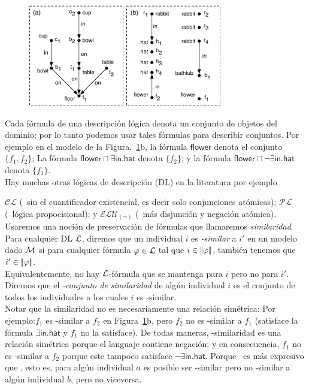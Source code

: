 \begin{figure}[t]
\begin{center}
\includegraphics[width=8.5cm]{figures/pic-dale-haddock.pdf}\\[0pt]
\caption{}
\label{fig:dale-haddock}
\end{center}
\end{figure}


Cada f\'ormula de una descripci\'on l\'ogica denota un conjunto de objetos del dominio; por lo tanto podemos usar tales f\'ormulas para describir conjuntos. Por ejemplo en el modelo de la Figura.~\ref{fig:dale-haddock}b, la f\'ormula
$\mathsf{flower}$ denota el conjunto $\{f_1,f_2\}$; La f\'ormula
$\mathsf{flower} \sqcap \exists \mathsf{in}.\mathsf{hat}$ denota
$\{f_2\}$; y la f\'ormula $\mathsf{flower} \sqcap \neg
\exists \mathsf{in}.\mathsf{hat}$ denota $\{f_1\}$.\\

Hay muchas otras l\'ogicas de descripci\'on (DL) en la literatura por ejemplo 

$\mathcal{CL}$ (\el\ sin el cuantificador existencial, es decir solo conjunciones at\'omicas); $\mathcal{PL}$ (\alc\ l\'ogica propocisional); y
$\mathcal{ELU}_{(\neg)}$ (\el\ m\'as disjunci\'on y negaci\'on at\'omica).\\

Usaremos una noci\'on de preservaci\'on de f\'ormulas que llamaremos
\emph{similaridad}. Para cualquier DL $\mathcal{L}$, diremos que un individual $i$ es \emph{\gL-similar} a $i'$ en un modelo dado $\mathcal{M}$
si para cualquier f\'ormula $\varphi \in \mathcal{L}$ tal que $i \in
|\!|\varphi|\!|$, tambi\'en tenemos que $i' \in |\!|\varphi|\!|$.\\
Equivalentemente, no hay $\mathcal{L}$-f\'ormula que se mantenga para $i$ pero no para
$i'$.  Diremos que el \emph{\gL-conjunto de similaridad} de alg\'un individual
$i$ es el conjunto de todos los individuales a los cuales $i$ es \gL-similar.\\

Notar que la similaridad no es necesariamente una relaci\'on sim\'etrica: Por ejemplo:$f_1$ es \el-similar a $f_2$ en
Figura~\ref{fig:dale-haddock}b, pero $f_2$ no es \el-similar a $f_1$
(satisface la f\'ormula $\exists \mathsf{in}.\mathsf{hat}$ y $f_1$
no la satisface).  De todas maneras, \alc-similaridad es una relaci\'on sim\'etrica porque
el languaje contiene negaci\'on; y en consecuencia, $f_1$ no es \alc-similar
a $f_2$ porque este tampoco satisface $\neg \exists
\mathsf{in}.\mathsf{hat}$.  Porque \alc\ es m\'as expresivo que \el,
esto es, para alg\'un individual $a$ es posible ser \el-similar pero
no \alc-similar a alg\'un individual $b$, pero no viceversa.\\



